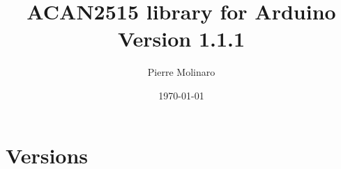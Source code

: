 \documentclass[10pt, a4paper, obeyspaces]{extarticle}
\begin{document}
 


\title{\bf \Huge{ACAN2515 library for Arduino\\Version 1.1.1}}
\author{Pierre Molinaro}
\date {\today}

\maketitle


\tableofcontents


\section{Versions}
\end{document}
